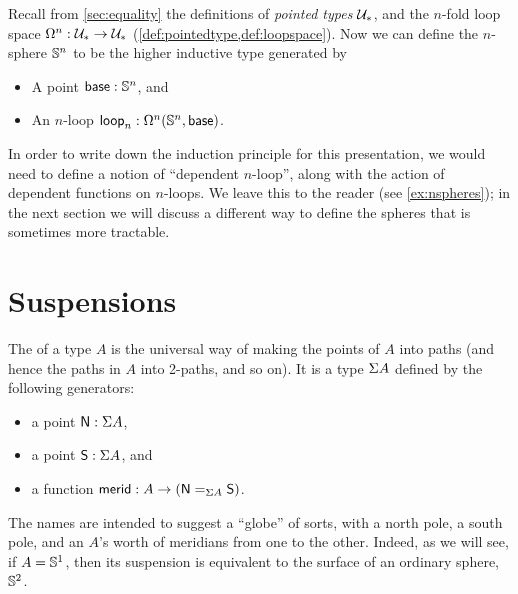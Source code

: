 %
Recall from \autoref{sec:equality} the definitions of \emph{pointed types} $\type_*$, and the $n$-fold loop space $\Omega^n : \type_* \to \type_*$
(\cref{def:pointedtype,def:loopspace}).  Now we can define the
$n$-sphere $\Sn^n$ to be the higher inductive type generated by
%
\begin{itemize}
\item A point $\base:\Sn^n$, and
\item An $n$-loop $\lloop_n : \Omega^n(\Sn^n,\base)$.
\end{itemize}
In order to write down the induction principle for this presentation, we would need to define a notion of ``dependent $n$-loop'', along with the action of dependent functions on $n$-loops.
We leave this to the reader (see \autoref{ex:nspheres}); in the next section we will discuss a different way to define the spheres that is sometimes more tractable.


\section{Suspensions}
\label{sec:suspension}

%
%
The  of a type $A$ is the universal way of making the points of $A$ into paths (and hence the paths in $A$ into 2-paths, and so on).
It is a type $\susp A$ defined by the following generators:
\begin{itemize}
\item a point $\north:\susp A$,
\item a point $\south:\susp A$, and
\item a function $\merid:A \to (\id[\susp A]\north\south)$.
\end{itemize}
The names are intended to suggest a ``globe'' of sorts, with a north pole, a south pole, and an $A$'s worth of meridians
%
%
from one to the other.
Indeed, as we will see, if $A=\Sn^1$, then its suspension is equivalent to the surface of an ordinary sphere, $\Sn^2$.

